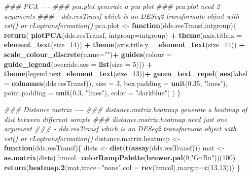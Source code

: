 \documentclass[
  12pt,
]{article}
\newenvironment{Shaded}{\begin{snugshade}}{\end{snugshade}}
\newcommand{\CommentTok}[1]{\textcolor[rgb]{0.56,0.35,0.01}{\textit{#1}}}
\newcommand{\ControlFlowTok}[1]{\textcolor[rgb]{0.13,0.29,0.53}{\textbf{#1}}}
\newcommand{\DataTypeTok}[1]{\textcolor[rgb]{0.13,0.29,0.53}{#1}}
\newcommand{\DecValTok}[1]{\textcolor[rgb]{0.00,0.00,0.81}{#1}}
\newcommand{\FloatTok}[1]{\textcolor[rgb]{0.00,0.00,0.81}{#1}}
\newcommand{\KeywordTok}[1]{\textcolor[rgb]{0.13,0.29,0.53}{\textbf{#1}}}
\newcommand{\NormalTok}[1]{#1}
\newcommand{\OperatorTok}[1]{\textcolor[rgb]{0.81,0.36,0.00}{\textbf{#1}}}
\newcommand{\StringTok}[1]{\textcolor[rgb]{0.31,0.60,0.02}{#1}}
\begin{document}
\begin{Shaded}
\begin{Highlighting}[]
{{{\CommentTok{### PCA ----}
\CommentTok{### pca.plot generate a pca plot}
\CommentTok{### pca.plot need 2 arguments}
\CommentTok{###   - dds.resTransf which is an DESeq2 transformate object with vst() or rLogtransformation()}
\NormalTok{pca.plot <-}\StringTok{ }\ControlFlowTok{function}\NormalTok{(dds.resTransf,intgroup)\{}
  \KeywordTok{return}\NormalTok{(}
    \KeywordTok{plotPCA}\NormalTok{(dds.resTransf, }\DataTypeTok{intgroup=}\NormalTok{intgroup) }\OperatorTok{+}
\StringTok{      }\KeywordTok{theme}\NormalTok{(}\DataTypeTok{axis.title.x =} \KeywordTok{element_text}\NormalTok{(}\DataTypeTok{size=}\DecValTok{14}\NormalTok{)) }\OperatorTok{+}
\StringTok{      }\KeywordTok{theme}\NormalTok{(}\DataTypeTok{axis.title.y =} \KeywordTok{element_text}\NormalTok{(}\DataTypeTok{size=}\DecValTok{14}\NormalTok{)) }\OperatorTok{+}
\StringTok{      }\KeywordTok{scale_colour_discrete}\NormalTok{(}\DataTypeTok{name=}\StringTok{""}\NormalTok{)}\OperatorTok{+}
\StringTok{      }\KeywordTok{guides}\NormalTok{(}\DataTypeTok{colour =} \KeywordTok{guide_legend}\NormalTok{(}\DataTypeTok{override.aes =} \KeywordTok{list}\NormalTok{(}\DataTypeTok{size =} \DecValTok{5}\NormalTok{))) }\OperatorTok{+}
\StringTok{      }\KeywordTok{theme}\NormalTok{(}\DataTypeTok{legend.text=}\KeywordTok{element_text}\NormalTok{(}\DataTypeTok{size=}\DecValTok{13}\NormalTok{))}\OperatorTok{+}
\StringTok{      }\KeywordTok{geom_text_repel}\NormalTok{(}
        \KeywordTok{aes}\NormalTok{(}\DataTypeTok{label =} \KeywordTok{colnames}\NormalTok{(dds.resTransf)),}
        \DataTypeTok{size =} \DecValTok{3}\NormalTok{,}
        \DataTypeTok{box.padding =} \KeywordTok{unit}\NormalTok{(}\FloatTok{0.35}\NormalTok{, }\StringTok{"lines"}\NormalTok{),}
        \DataTypeTok{point.padding =} \KeywordTok{unit}\NormalTok{(}\FloatTok{0.3}\NormalTok{, }\StringTok{"lines"}\NormalTok{), }\DataTypeTok{color =} \StringTok{"darkblue"}\NormalTok{)}
\NormalTok{  )}
\NormalTok{\}}

\CommentTok{### Distance matrix ----}
\CommentTok{### distance.matrix.heatmap generate a heatmap of dist between different sample}
\CommentTok{### distance.matrix.heatmap need just one argument}
\CommentTok{###   - dds.resTransf which is an DESeq2 transformate object with vst() or rLogtransformation()}
\NormalTok{distance.matrix.heatmap <-}\StringTok{ }\ControlFlowTok{function}\NormalTok{(dds.resTransf)\{}
\NormalTok{  dists <-}\StringTok{ }\KeywordTok{dist}\NormalTok{(}\KeywordTok{t}\NormalTok{(}\KeywordTok{assay}\NormalTok{(dds.resTransf)))}
\NormalTok{  mat <-}\StringTok{ }\KeywordTok{as.matrix}\NormalTok{(dists)}
\NormalTok{  hmcol=}\KeywordTok{colorRampPalette}\NormalTok{(}\KeywordTok{brewer.pal}\NormalTok{(}\DecValTok{9}\NormalTok{,}\StringTok{"GnBu"}\NormalTok{))(}\DecValTok{100}\NormalTok{)}
  \KeywordTok{return}\NormalTok{(}\KeywordTok{heatmap.2}\NormalTok{(mat,}\DataTypeTok{trace=}\StringTok{"none"}\NormalTok{,}\DataTypeTok{col =} \KeywordTok{rev}\NormalTok{(hmcol),}\DataTypeTok{margin=}\KeywordTok{c}\NormalTok{(}\DecValTok{13}\NormalTok{,}\DecValTok{13}\NormalTok{)))}
\NormalTok{\}}



}}}
\end{Highlighting}
\end{Shaded}
\end{document}
